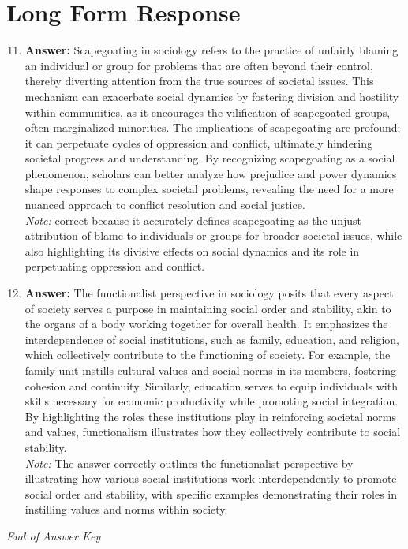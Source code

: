 \documentclass[12pt]{article}
\begin{document}
\section*{Long Form Response}
\begin{enumerate}[label=\arabic*.]
\setcounter{enumi}{10}
\item \textbf{Answer:} Scapegoating in sociology refers to the practice of unfairly blaming an individual or group for problems that are often beyond their control, thereby diverting attention from the true sources of societal issues. This mechanism can exacerbate social dynamics by fostering division and hostility within communities, as it encourages the vilification of scapegoated groups, often marginalized minorities. The implications of scapegoating are profound; it can perpetuate cycles of oppression and conflict, ultimately hindering societal progress and understanding. By recognizing scapegoating as a social phenomenon, scholars can better analyze how prejudice and power dynamics shape responses to complex societal problems, revealing the need for a more nuanced approach to conflict resolution and social justice.
\\ \textit{Note:} correct because it accurately defines scapegoating as the unjust attribution of blame to individuals or groups for broader societal issues, while also highlighting its divisive effects on social dynamics and its role in perpetuating oppression and conflict.
\item \textbf{Answer:} The functionalist perspective in sociology posits that every aspect of society serves a purpose in maintaining social order and stability, akin to the organs of a body working together for overall health. It emphasizes the interdependence of social institutions, such as family, education, and religion, which collectively contribute to the functioning of society. For example, the family unit instills cultural values and social norms in its members, fostering cohesion and continuity. Similarly, education serves to equip individuals with skills necessary for economic productivity while promoting social integration. By highlighting the roles these institutions play in reinforcing societal norms and values, functionalism illustrates how they collectively contribute to social stability.
\\ \textit{Note:} The answer correctly outlines the functionalist perspective by illustrating how various social institutions work interdependently to promote social order and stability, with specific examples demonstrating their roles in instilling values and norms within society.
\end{enumerate}

\vfill
\noindent\textit{End of Answer Key}
\end{document}
